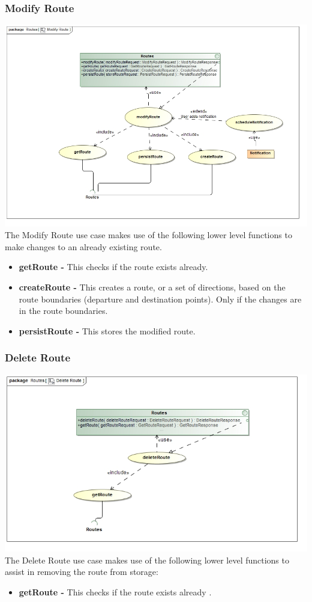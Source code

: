 \documentclass[a4paper,12pt]{article}
\begin{document}
\subsubsection{Modify Route} 
\includegraphics[width=\textwidth]{images/Modify_Route.jpg}
The Modify Route use case makes use of the following lower level functions to make changes to an already existing route.
\begin{itemize}
\item \textbf{getRoute -} This checks if the route exists already.
\item \textbf{createRoute -} This creates a route, or a set of directions, based on the route boundaries (departure and destination points). Only if the changes are in the route boundaries.
\item \textbf{persistRoute -} This stores the modified route.
\end{itemize}
\subsubsection{Delete Route}
\includegraphics[width=\textwidth]{images/Delete_Route.jpg}
The Delete Route use case makes use of the following lower level functions to assist in removing the route from storage:
\begin{itemize}
\item \textbf{getRoute -} This checks if the route exists already .
\end{itemize}
\end{document}
